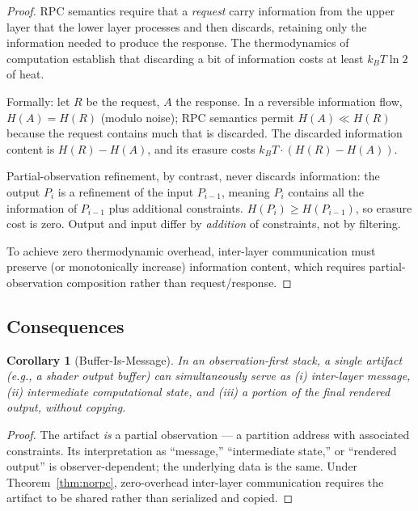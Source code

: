 \documentclass[11pt,a4paper]{article}
\newtheorem{corollary}[theorem]{Corollary}
\theoremstyle{definition}
\theoremstyle{remark}
\begin{document}
\begin{proof}
RPC semantics require that a \emph{request} carry information from the upper layer that the lower layer processes and then discards, retaining only the information needed to produce the response. The thermodynamics of computation \citep{landauer1961irreversibility, bennett1982thermodynamics} establish that discarding a bit of information costs at least $k_B T \ln 2$ of heat.

Formally: let $R$ be the request, $A$ the response. In a reversible information flow, $H(A) = H(R)$ (modulo noise); RPC semantics permit $H(A) \ll H(R)$ because the request contains much that is discarded. The discarded information content is $H(R) - H(A)$, and its erasure costs $k_B T \cdot (H(R) - H(A))$.

Partial-observation refinement, by contrast, never discards information: the output $P_i$ is a refinement of the input $P_{i-1}$, meaning $P_i$ contains all the information of $P_{i-1}$ plus additional constraints. $H(P_i) \geq H(P_{i-1})$, so erasure cost is zero. Output and input differ by \emph{addition} of constraints, not by filtering.

To achieve zero thermodynamic overhead, inter-layer communication must preserve (or monotonically increase) information content, which requires partial-observation composition rather than request/response.
\end{proof}

\subsection{Consequences}

\begin{corollary}[Buffer-Is-Message]
\label{cor:buffer}
In an observation-first stack, a single artifact (e.g., a shader output buffer) can simultaneously serve as (i) inter-layer message, (ii) intermediate computational state, and (iii) a portion of the final rendered output, without copying.
\end{corollary}

\begin{proof}
The artifact \emph{is} a partial observation --- a partition address with associated constraints. Its interpretation as ``message,'' ``intermediate state,'' or ``rendered output'' is observer-dependent; the underlying data is the same. Under Theorem~\ref{thm:norpc}, zero-overhead inter-layer communication requires the artifact to be shared rather than serialized and copied.
\end{proof}
\end{document}
